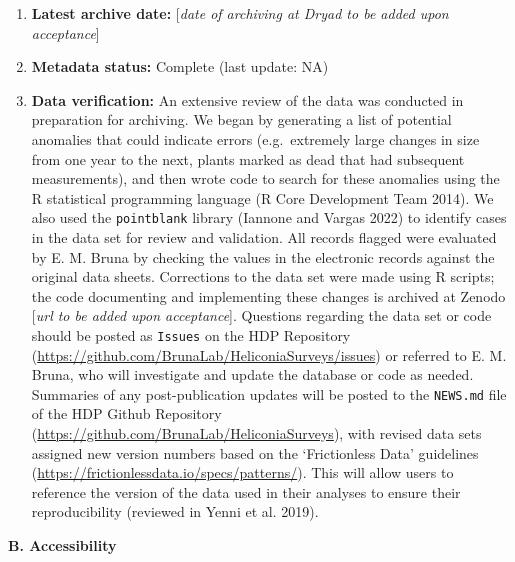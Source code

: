 \documentclass[
  man, donotrepeattitle,floatsintext]{apa6}
\begin{document}
\begin{enumerate}
\def\labelenumi{\arabic{enumi}.}
\setcounter{enumi}{1}
\item
  \textbf{Latest archive date:} {[}\emph{date of archiving at Dryad to be added upon acceptance}{]}
\item
  \textbf{Metadata status:} Complete (last update:
  NA)
\item
  \textbf{Data verification:} An extensive review of the data was conducted in preparation for archiving. We began by generating a list of potential anomalies that could indicate errors (e.g.~extremely large changes in size from one year to the next, plants marked as dead that had subsequent measurements), and then wrote code to search for these anomalies using the R statistical programming language (R Core Development Team 2014). We also used the \texttt{pointblank} library (Iannone and Vargas 2022) to identify cases in the data set for review and validation. All records flagged were evaluated by E. M. Bruna by checking the values in the electronic records against the original data sheets. Corrections to the data set were made using R scripts; the code documenting and implementing these changes is archived at Zenodo {[}\emph{url to be added upon acceptance}{]}. Questions regarding the data set or code should be posted as \texttt{Issues} on the HDP Repository (\url{https://github.com/BrunaLab/HeliconiaSurveys/issues}) or referred to E. M. Bruna, who will investigate and update the database or code as needed. Summaries of any post-publication updates will be posted to the \texttt{NEWS.md} file of the HDP Github Repository (\url{https://github.com/BrunaLab/HeliconiaSurveys}), with revised data sets assigned new version numbers based on the `Frictionless Data' guidelines (\url{https://frictionlessdata.io/specs/patterns/}). This will allow users to reference the version of the data used in their analyses to ensure their reproducibility (reviewed in Yenni et al. 2019).
\end{enumerate}

\noindent 
\textbf{B. Accessibility}
\end{document}
